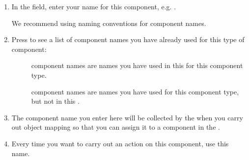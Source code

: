 \begin{enumerate}
\item In the  field, enter your name for this component, e.g. . 

We recommend using naming conventions for component names. 

\item Press  to see a list of component names you have already used for this type of component:

\begin{description}
\item[]{ component names are names you have used in this \gdcase{} for this component type. }
\item []{ component names are names you have used for this component type, but not in this \gdcase{}. }
 \end{description}

\item The component name you enter here will be collected by the \gdomeditor{} when you carry out object mapping so that you can assign it to a component in the \gdaut{}. 

\item Every time you want to carry out an action on this component, use this name. 
\end{enumerate}


